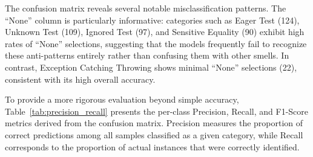 \documentclass[sigconf]{acmart}
\begin{document}
The confusion matrix reveals several notable misclassification patterns. The ``None'' column is particularly informative: categories such as Eager Test (124), Unknown Test (109), Ignored Test (97), and Sensitive Equality (90) exhibit high rates of ``None'' selections, suggesting that the models frequently fail to recognize these anti-patterns entirely rather than confusing them with other smells. In contrast, Exception Catching Throwing shows minimal ``None'' selections (22), consistent with its high overall accuracy.

To provide a more rigorous evaluation beyond simple accuracy, Table~\ref{tab:precision_recall} presents the per-class Precision, Recall, and F1-Score metrics derived from the confusion matrix. Precision measures the proportion of correct predictions among all samples classified as a given category, while Recall corresponds to the proportion of actual instances that were correctly identified.
\end{document}
